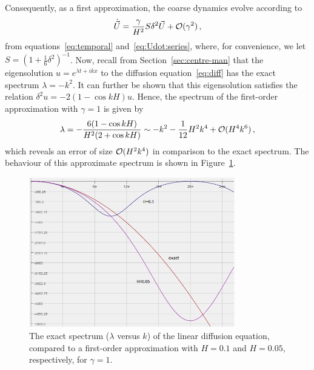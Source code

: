 \documentclass[12pt,a5paper]{article}
\begin{document}
Consequently, as a first approximation, the coarse dynamics evolve according to
\begin{eqnarray}
	\dot{\vec U} = \frac{\gamma}{H^2}S\delta^2\vec U + {\cal O}(\gamma^2)\,,
\end{eqnarray}
from equations~\eqref{eq:temporal} and~\eqref{eq:Udot:series},
where, for convenience, we let $S=(1+\frac{1}{6}\delta^2)^{-1}$.
Now, recall from Section~\ref{sec:centre-man} that the eigensolution $u=e^{\lambda t+ikx}$ %
to the diffusion equation~\eqref{eq:diff} has the exact spectrum $\lambda=-k^2$.
It can further be shown that this eigensolution  satisfies the relation 
$\delta^2u=-2(1-\cos kH)u$. Hence, the spectrum of the first-order approximation with $\gamma=1$ is
given by
\begin{eqnarray}
\lambda = -\frac{6(1-\cos kH)}{H^2(2+\cos kH)} \sim -k^2-\frac{1}{12}H^2k^4+{\cal O}(H^4k^6)\,,
\label{eq:spec:1st}
\end{eqnarray}
which reveals an error of size ${\cal O}(H^2k^4)$ in comparison to the exact spectrum.
The behaviour of this approximate spectrum is shown in Figure~\ref{fig:spec:first-order}.
\begin{figure}[hbt]
\centering
\includegraphics[width=0.8\textwidth]{figures/first-order-spectrum.png}
\caption{The exact spectrum ($\lambda$ versus $k$) of the linear diffusion equation, compared to a first-order approximation with $H=0.1$ and $H=0.05$, respectively, for $\gamma=1$.}
\label{fig:spec:first-order}
\end{figure}
\end{document}

